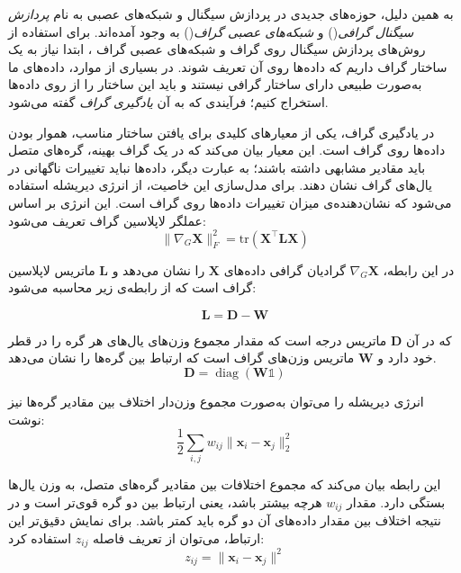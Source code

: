 \documentclass[10pt,twocolumn,a4paper]{article}
\begin{document}
    به همین دلیل، حوزه‌های جدیدی در پردازش سیگنال و شبکه‌های عصبی به نام 
	\textit{پردازش سیگنال گرافی}()\cite{GSP}
     و
	\textit{شبکه‌های عصبی گراف}()\cite{GNN}
      به وجود آمده‌اند.
      برای استفاده از روش‌های پردازش سیگنال روی گراف و شبکه‌های عصبی گراف ، ابتدا نیاز به یک ساختار گراف داریم که داده‌ها روی آن تعریف شوند. در بسیاری از موارد، داده‌های ما به‌صورت طبیعی دارای ساختار گرافی نیستند و باید این ساختار را از روی داده‌ها استخراج کنیم؛ فرآیندی که به آن 
            \textit{یادگیری گراف}
      گفته می‌شود.
      
     

     
     
     
     در یادگیری گراف، یکی از معیارهای کلیدی برای یافتن ساختار مناسب، هموار بودن داده‌ها روی گراف است. این معیار بیان می‌کند که در یک گراف بهینه، گره‌های متصل باید مقادیر مشابهی داشته باشند؛ به عبارت دیگر، داده‌ها نباید تغییرات ناگهانی در یال‌های گراف نشان دهند. برای مدل‌سازی این خاصیت، از انرژی دیریشله استفاده می‌شود که نشان‌دهنده‌ی میزان تغییرات داده‌ها روی گراف است. این انرژی بر اساس عملگر لاپلاسین گراف تعریف می‌شود:
     \begin{equation}
     	     \|\nabla_G \bm{X}\|_F^2 = \text{tr} (\bm{X}^\top \bm{L} \bm{X})
     \end{equation}
     
     در این رابطه، \( \nabla_G \bm{X} \) گرادیان گرافی داده‌های \( \bm{X} \) را نشان می‌دهد و \( \bm{L} \) ماتریس لاپلاسین گراف است که از رابطه‌ی زیر محاسبه می‌شود:
     
\begin{equation}\label{eq:defL}
	     \bm{L} = \bm{D} - \bm{W}
\end{equation}
     
     که در آن \( \bm{D} \) ماتریس درجه است که مقدار مجموع وزن‌های یال‌های هر گره را در قطر خود دارد و \( \bm{W} \) ماتریس وزن‌های گراف است که ارتباط بین گره‌ها را نشان می‌دهد.
     \begin{equation}\label{eq:defD}
     	\bm{D} = \operatorname{diag}(\bm{W}\mathds{1})
     \end{equation}
     
      انرژی دیریشله را می‌توان به‌صورت مجموع وزن‌دار اختلاف بین مقادیر گره‌ها نیز نوشت:
  \begin{equation}
  	     \frac{1}{2} \sum_{i,j} w_{ij} \|\bm{x}_i - \bm{x}_j\|_2^2
  \end{equation}
     
     این رابطه بیان می‌کند که مجموع اختلافات بین مقادیر گره‌های متصل، به وزن یال‌ها بستگی دارد. مقدار \( w_{ij} \) هرچه بیشتر باشد، یعنی ارتباط بین دو گره قوی‌تر است و در نتیجه اختلاف بین مقدار داده‌های آن دو گره باید کمتر باشد. برای نمایش دقیق‌تر این ارتباط، می‌توان از تعریف فاصله \( z_{ij} \) استفاده کرد:
\begin{equation}
	     z_{ij} = \|\bm{x}_i - \bm{x}_j\|^2
\end{equation}
     
\end{document}
